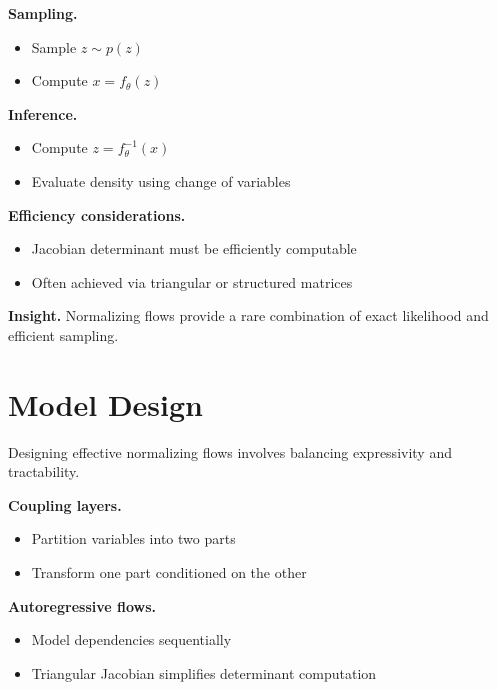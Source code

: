 \noindent
\textbf{Sampling.}
\begin{itemize}
    \item Sample $z \sim p(z)$
    \item Compute $x = f_\theta(z)$
\end{itemize}

\medskip

\noindent
\textbf{Inference.}
\begin{itemize}
    \item Compute $z = f_\theta^{-1}(x)$
    \item Evaluate density using change of variables
\end{itemize}

\medskip

\noindent
\textbf{Efficiency considerations.}
\begin{itemize}
    \item Jacobian determinant must be efficiently computable
    \item Often achieved via triangular or structured matrices
\end{itemize}

\medskip

\noindent
\textbf{Insight.}  
Normalizing flows provide a rare combination of exact likelihood and efficient sampling.

\section{Model Design}

Designing effective normalizing flows involves balancing expressivity and tractability.

\medskip

\noindent
\textbf{Coupling layers.}
\begin{itemize}
    \item Partition variables into two parts
    \item Transform one part conditioned on the other
\end{itemize}

\medskip

\noindent
\textbf{Autoregressive flows.}
\begin{itemize}
    \item Model dependencies sequentially
    \item Triangular Jacobian simplifies determinant computation
\end{itemize}

\medskip

